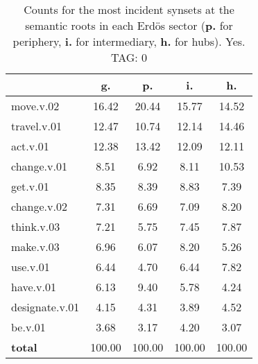\begin{table}[h!]
\begin{center}
\begin{tabular}{| l || c | c | c | c |}\hline
 & {\bf g.} & {\bf p.} & {\bf i.} & {\bf h.} \\\hline\hline
move.v.02 & 16.42  & 20.44  & 15.77  & 14.52 \\\hline
travel.v.01 & 12.47  & 10.74  & 12.14  & 14.46 \\\hline
act.v.01 & 12.38  & 13.42  & 12.09  & 12.11 \\\hline
change.v.01 & 8.51  & 6.92  & 8.11  & 10.53 \\\hline
get.v.01 & 8.35  & 8.39  & 8.83  & 7.39 \\\hline
change.v.02 & 7.31  & 6.69  & 7.09  & 8.20 \\\hline
think.v.03 & 7.21  & 5.75  & 7.45  & 7.87 \\\hline
make.v.03 & 6.96  & 6.07  & 8.20  & 5.26 \\\hline
use.v.01 & 6.44  & 4.70  & 6.44  & 7.82 \\\hline
have.v.01 & 6.13  & 9.40  & 5.78  & 4.24 \\\hline
designate.v.01 & 4.15  & 4.31  & 3.89  & 4.52 \\\hline
be.v.01 & 3.68  & 3.17  & 4.20  & 3.07 \\\hline\hline
{{\bf total}} & 100.00  & 100.00  & 100.00  & 100.00 \\\hline
\end{tabular}
\caption{Counts for the most incident synsets at the semantic roots in each Erd\"os sector ({\bf p.} for periphery, {\bf i.} for intermediary, {\bf h.} for hubs). Yes. TAG: 0}
\end{center}
\end{table}